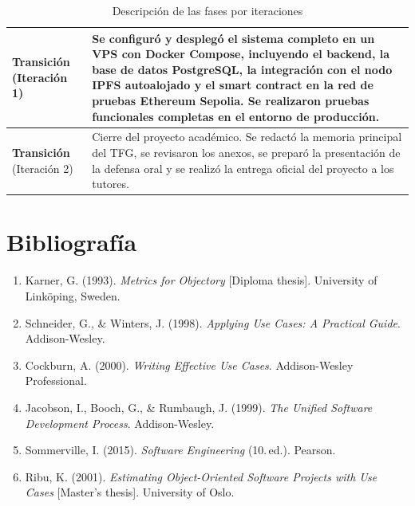 \documentclass[11pt, a4paper]{article}
\begin{document}
\begin{table}[H]
\begin{tabular}{|p{4cm}|p{10cm}|}
\hline
\textbf{Transición} (Iteración 1) &
Se configuró y desplegó el sistema completo en un VPS con Docker Compose, incluyendo el backend, la base de datos PostgreSQL, la integración con el nodo IPFS autoalojado y el smart contract en la red de pruebas Ethereum Sepolia. Se realizaron pruebas funcionales completas en el entorno de producción. \\
\hline
\textbf{Transición} (Iteración 2) &
Cierre del proyecto académico. Se redactó la memoria principal del TFG, se revisaron los anexos, se preparó la presentación de la defensa oral y se realizó la entrega oficial del proyecto a los tutores. \\
\hline
\end{tabular}
\caption{Descripción de las fases por iteraciones}
\end{table}

\section*{Bibliografía}

\begin{enumerate}
    \item Karner, G. (1993). \textit{Metrics for Objectory} [Diploma thesis]. University of Linköping, Sweden.
    \item Schneider, G., \& Winters, J. (1998). \textit{Applying Use Cases: A Practical Guide}. Addison-Wesley.
    \item Cockburn, A. (2000). \textit{Writing Effective Use Cases}. Addison-Wesley Professional.
    \item Jacobson, I., Booch, G., \& Rumbaugh, J. (1999). \textit{The Unified Software Development Process}. Addison-Wesley.
    \item Sommerville, I. (2015). \textit{Software Engineering} (10.\textordfeminine\,ed.). Pearson.
    \item Ribu, K. (2001). \textit{Estimating Object-Oriented Software Projects with Use Cases} [Master's thesis]. University of Oslo.
\end{enumerate}
\end{document}
